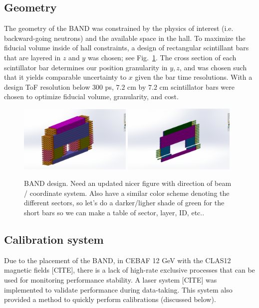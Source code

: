 \documentclass[review]{elsarticle}
\begin{document}
\subsection{Geometry}
The geometry of the BAND was constrained by the physics of interest (i.e. backward-going neutrons) \cite{Emcsrcdeens} and the available space in the hall. To
maximize the fiducial volume inside of hall constraints, a design of rectangular scintillant bars that are layered in $z$ and $y$ was chosen; see Fig.~\ref{fig:design}.
The cross section of each scintillator bar determines our position granularity in $y,z$, and was chosen such that it yields comparable uncertainty to $x$ given the bar 
time resolutions. With a design ToF resolution below $300$ \si{\pico\second}, $7.2$ \si{\centi\meter} by $7.2$ \si{\centi\meter} scintillator bars were chosen to optimize
fiducial volume, granularity, and cost.
\begin{figure}[h]
	\centering
		\includegraphics[width=0.48\textwidth]{Band01.png}
		\includegraphics[width=0.48\textwidth]{BandVeto.png}
		\caption{BAND design. Need an updated nicer figure with direction of beam / coordinate system. Also have a similar 
		color scheme denoting the different sectors, so let's do a darker/ligher shade of green for the short bars so we can make 
		a table of sector, layer, ID, etc..}
		\label{fig:design}
\end{figure}

\subsection{Calibration system}
Due to the placement of the BAND, in CEBAF 12 \si{\giga\electronvolt} with the CLAS12 magnetic fields [{\color{red}CITE}], there is a lack of high-rate exclusive processes 
that can be used for monitoring performance stability. A laser system [{\color{red}CITE}] was implemented to validate performance during data-taking. This system also 
provided a method to quickly perform calibrations (discussed below).
\end{document}
